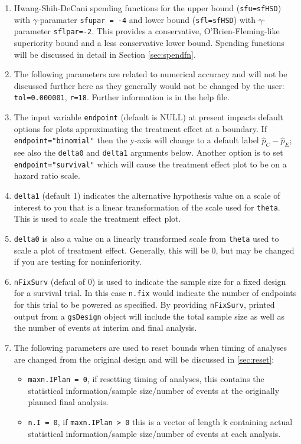 \begin{enumerate}
\item Hwang-Shih-DeCani spending functions for the upper bound (\texttt{sfu=sfHSD}) with $\gamma$-paramater \texttt{sfupar = -4} and lower bound (\texttt{sfl=sfHSD}) with $\gamma$-parameter \texttt{sflpar=-2}. 
This provides a conservative, O'Brien-Fleming-like superiority bound and a less conservative lower bound.
Spending functions will be discussed in detail in Section \ref{sec:spendfn}.
\item The following parameters are related to numerical accuracy and will not be discussed further here as they generally would not be changed by the user: \texttt{tol=0.000001}, \texttt{r=18}. Further information is in the help file. 
\item The input variable \texttt{endpoint} (default is NULL) at present impacts default options for plots approximating the treatment effect at a boundary. If \texttt{endpoint="binomial"} then the y-axis will change to a default label $\hat{p}_C-\hat{p}_E$; see also the \texttt{delta0} and \texttt{delta1} arguments below.
Another option is to set \texttt{endpoint="survival"} which will cause the treatment effect plot to be on a hazard ratio scale.
\item \texttt{delta1} (default 1) indicates the alternative hypothesis value on a scale of interest to you that is a linear transformation of the scale used for \texttt{theta}. This is used to scale the treatment effect plot.
\item \texttt{delta0} is also a value on a linearly transformed scale from \texttt{theta} used to scale a plot of treatment effect. Generally, this will be 0, but may be changed if you are testing for noninferiority. 
\item \texttt{nFixSurv} (defaul of 0) is used to indicate the sample size for a fixed design for a survival trial. In this case \texttt{n.fix} would indicate the number of endpoints for this trial to be powered as specified. By providing \texttt{nFixSurv}, printed output from a \texttt{gsDesign} object will include the total sample size as well as the number of events at interim and final analysis.
\item The following parameters are used to reset bounds when timing of analyses are changed from the original design and will be discussed in \ref{sec:reset}:
\begin{itemize}
\item \texttt{maxn.IPlan = 0}, if resetting timing of analyses, this contains the statistical information/sample size/number of events at the originally planned final analysis.
\item \texttt{n.I = 0}, if \texttt{maxn.IPlan > 0} this is a vector of length \texttt{k} containing actual statistical information/sample size/number of events at each analysis.
\end{itemize}
\end{enumerate}

